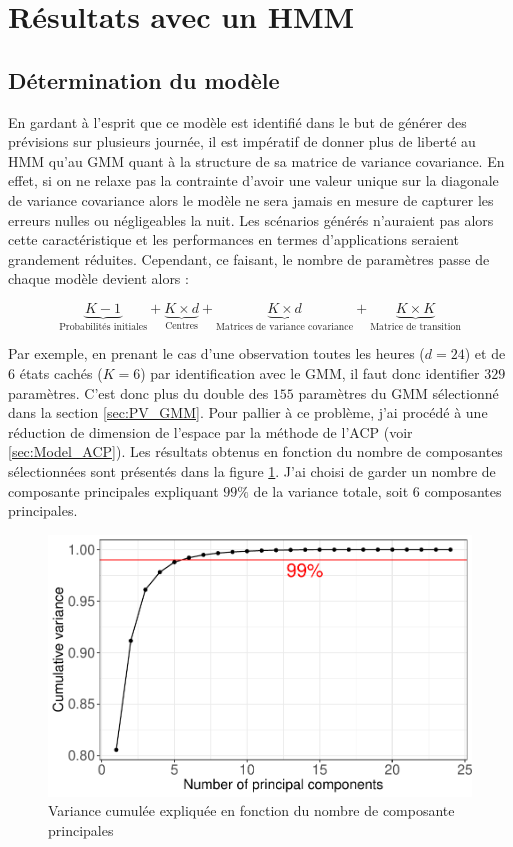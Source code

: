 \documentclass[12pt]{report}
\begin{document}
\section{Résultats avec un HMM}
\label{sec:PV_HMM}

\subsection{Détermination du modèle}

En gardant à l'esprit que ce modèle est identifié dans le but de générer des prévisions sur plusieurs journée, il est impératif de donner plus de liberté au HMM qu'au GMM quant à la structure de sa matrice de variance covariance. En effet, si on ne relaxe pas la contrainte d'avoir une valeur unique sur la diagonale de variance covariance alors le modèle ne sera jamais en mesure de capturer les erreurs nulles ou négligeables la nuit. Les scénarios générés n'auraient pas alors cette caractéristique et les performances en termes d'applications seraient grandement réduites. Cependant, ce faisant, le nombre de paramètres passe de chaque modèle devient alors :

\begin{equation}
\underbrace{K-1}_\text{Probabilités initiales}  + \underbrace{K \times d}_\text{Centres}  +  \underbrace{K \times d}_\text{Matrices de variance covariance} + \underbrace{K \times K}_\text{Matrice de transition}
\end{equation}

Par exemple, en prenant le cas d'une observation toutes les heures ($d=24$) et de 6 états cachés ($K=6$) par identification avec le GMM, il faut donc identifier $329$ paramètres. C'est donc plus du double des $155$ paramètres du GMM sélectionné dans la section \ref{sec:PV_GMM}. Pour pallier à ce problème, j'ai procédé à une réduction de dimension de l'espace par la méthode de l'ACP (voir \ref{sec:Model_ACP}). Les résultats obtenus en fonction du nombre de composantes sélectionnées sont présentés dans la figure \ref{fig:PV_HMM_ACP_DimSelect}. J'ai choisi de garder un nombre de composante principales expliquant $99 \%$ de la variance totale, soit 6 composantes principales. 

\begin{figure}[htbp]
	\centering
	\includegraphics[width = 0.6 \linewidth]{Images/PV/ACP/ACP_DimSelect.pdf}
	\caption{Variance cumulée expliquée en fonction du nombre de composante principales}
	\label{fig:PV_HMM_ACP_DimSelect}
\end{figure}
\end{document}

